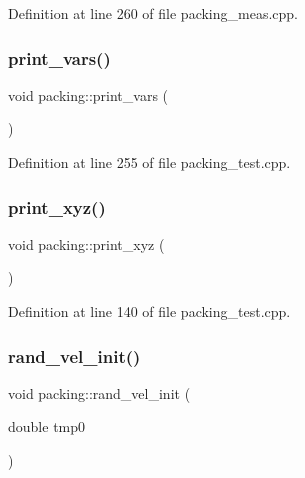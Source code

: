 Definition at line 260 of file packing\+\_\+meas.\+cpp.

\mbox{\label{classpacking_a153155d72d5c0ba11f22939ec59c7c87}} 
\subsubsection{\texorpdfstring{print\+\_\+vars()}{print\_vars()}}
{\footnotesize\ttfamily void packing\+::print\+\_\+vars (\begin{DoxyParamCaption}{ }\end{DoxyParamCaption})}



Definition at line 255 of file packing\+\_\+test.\+cpp.

\mbox{\label{classpacking_a810b179015e89063c7af6e5e3588380c}} 
\subsubsection{\texorpdfstring{print\+\_\+xyz()}{print\_xyz()}}
{\footnotesize\ttfamily void packing\+::print\+\_\+xyz (\begin{DoxyParamCaption}{ }\end{DoxyParamCaption})}



Definition at line 140 of file packing\+\_\+test.\+cpp.

\mbox{\label{classpacking_afa5fb6a5af7e185656c85f10534572a9}} 
\subsubsection{\texorpdfstring{rand\+\_\+vel\+\_\+init()}{rand\_vel\_init()}}
{\footnotesize\ttfamily void packing\+::rand\+\_\+vel\+\_\+init (\begin{DoxyParamCaption}\item[{double}]{tmp0 }\end{DoxyParamCaption})}



